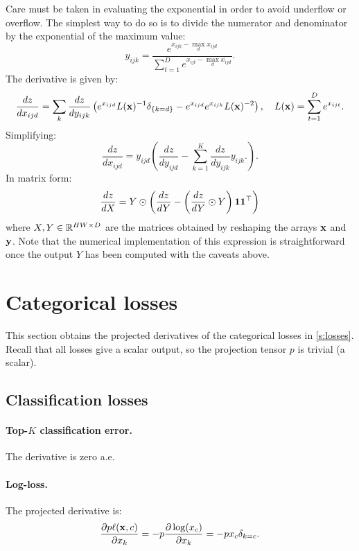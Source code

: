 Care must be taken in evaluating the exponential in order to avoid underflow or overflow. The simplest way to do so is to divide the numerator and denominator by the exponential of the maximum value:
\[
 y_{ijk} = \frac{e^{x_{ijk} - \max_d x_{ijd}}}{\sum_{t=1}^D e^{x_{ijt}- \max_d x_{ijd}}}.
\]
The derivative is given by:
\[
\frac{dz}{d x_{ijd}}
=
\sum_{k}
\frac{dz}{d y_{ijk}}
\left(
e^{x_{ijd}} L(\mathbf{x})^{-1} \delta_{\{k=d\}}
-
e^{x_{ijd}}
e^{x_{ijk}} L(\mathbf{x})^{-2}
\right),
\quad
L(\mathbf{x}) = \sum_{t=1}^D e^{x_{ijt}}.
\]
Simplifying:
\[
\frac{dz}{d x_{ijd}}
=
y_{ijd} 
\left(
\frac{dz}{d y_{ijd}}
-
\sum_{k=1}^K
\frac{dz}{d y_{ijk}} y_{ijk}.
\right).
\]
In matrix form:
\[
  \frac{dz}{dX} = Y \odot \left(\frac{dz}{dY} 
  - \left(\frac{dz}{dY} \odot Y\right) \mathbf{1}\mathbf{1}^\top\right)
\]
where $X,Y\in\mathbb{R}^{HW\times D}$ are the matrices obtained by reshaping the arrays
$\mathbf{x}$ and $\mathbf{y}$. Note that the numerical implementation of this expression is straightforward once the output $Y$ has been computed with the caveats above.

\section{Categorical losses}\label{s:impl-losses}

This section obtains the projected derivatives of the categorical losses in \cref{s:losses}. Recall that all losses give a scalar output, so the projection tensor $p$ is trivial (a scalar).

\subsection{Classification losses}\label{s:impl-loss-classification}

\paragraph{Top-$K$ classification error.} The derivative is zero a.e.\

\paragraph{Log-loss.} The projected derivative is:
\[
\frac{\partial p \ell(\mathbf{x},c)}{\partial x_k}
=
- p \frac{\partial \log (x_c) }{\partial x_k}
=
- p x_c \delta_{k=c}.
\]

